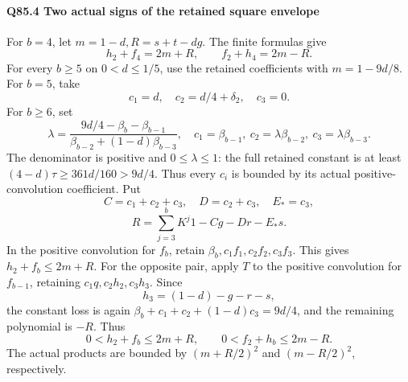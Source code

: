 \paragraph{Q85.4 Two actual signs of the retained square envelope}
For \(b=\allowbreak 4\), let \(m=\allowbreak 1-d,\allowbreak R=\allowbreak s+t-dg\). The finite formulas give
\[
 h_2+f_4=2m+R,\qquad f_2+h_4=2m-R.                  \tag{Q85.4.1}\label{eq:Q85:4.1}
\]
For every \(b\ge\allowbreak 5\) on \(0<\allowbreak d\le\allowbreak 1/5\), use the retained coefficients with \(m=\allowbreak 1-9d/8\).
For \(b=\allowbreak 5\), take
\[
 c_1=d,\quad c_2=d/4+\delta_2,\quad c_3=0.
\]
For \(b\ge\allowbreak 6\), set
\[
 \lambda=
 \frac{9d/4-\beta_b-\beta_{b-1}}
 {\beta_{b-2}+(1-d)\beta_{b-3}},\quad
 c_1=\beta_{b-1},\ c_2=\lambda\beta_{b-2},\ c_3=\lambda\beta_{b-3}.
                                                               \tag{Q85.4.2}\label{eq:Q85:4.2}
\]
The denominator is positive and \(0\le\allowbreak \lambda\le\allowbreak 1\):
the full retained constant is at least
\((4-d)\tau\ge\allowbreak 361d/160>\allowbreak 9d/4\).
Thus every \(c_i\) is bounded by its actual positive-convolution coefficient.
Put
\[
 C=c_1+c_2+c_3,\quad D=c_2+c_3,\quad E_*=c_3,
\]
\[
 R=\sum_{j=3}^b K^j1-Cg-Dr-E_*s.
\]
In the positive convolution for \(f_b\), retain
\(\beta_b,\allowbreak c_1f_1,\allowbreak c_2f_2,\allowbreak c_3f_3\). This gives \(h_2+f_b\le\allowbreak 2m+R\).
For the opposite pair, apply \(T\) to the positive convolution for \(f_{b-1}\), retaining \(c_1q,\allowbreak c_2h_2,\allowbreak c_3h_3\). Since
\[
 h_3=(1-d)-g-r-s,
\]
the constant loss is again
\(\beta_b+c_1+c_2+(1-d)c_3=\allowbreak 9d/4\), and the remaining polynomial is \(-R\).
Thus
\[
 0<h_2+f_b\le2m+R,\qquad
 0<f_2+h_b\le2m-R.                                  \tag{Q85.4.3}\label{eq:Q85:4.3}
\]
The actual products are bounded by \((m+R/2)^2\) and \((m-R/2)^2\), respectively.

